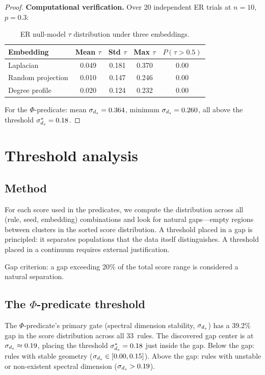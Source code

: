 \documentclass{../shared/primo}
\begin{document}
\begin{proof}
\textbf{Computational verification.} Over 20 independent ER trials at $n = 10$, $p = 0.3$:

\begin{table}[ht]
\centering
\begin{tabular}{lcccc}
\toprule
Embedding & Mean $\tau$ & Std $\tau$ & Max $\tau$ & $P(\tau > 0.5)$ \\
\midrule
Laplacian & 0.049 & 0.181 & 0.370 & 0.00 \\
Random projection & 0.010 & 0.147 & 0.246 & 0.00 \\
Degree profile & 0.020 & 0.124 & 0.232 & 0.00 \\
\bottomrule
\end{tabular}
\caption{ER null-model $\tau$ distribution under three embeddings.}
\label{tab:ernull}
\end{table}

For the $\Phi$-predicate: mean $\sigma_{d_s} = 0.364$, minimum $\sigma_{d_s} = 0.260$, all above the threshold $\sigma^*_{d_s} = 0.18$.
\end{proof}


\section{Threshold analysis}
\label{sec:thresholds}

\subsection{Method}

For each score used in the predicates, we compute the distribution across all (rule, seed, embedding) combinations and look for natural gaps---empty regions between clusters in the sorted score distribution. A threshold placed in a gap is principled: it separates populations that the data itself distinguishes. A threshold placed in a continuum requires external justification.

Gap criterion: a gap exceeding 20\% of the total score range is considered a natural separation.

\subsection{The $\Phi$-predicate threshold}

The $\Phi$-predicate's primary gate (spectral dimension stability, $\sigma_{d_s}$) has a 39.2\% gap in the score distribution across all 33~rules. The discovered gap center is at $\sigma_{d_s} \approx 0.19$, placing the threshold $\sigma^*_{d_s} = 0.18$ just inside the gap. Below the gap: rules with stable geometry ($\sigma_{d_s} \in [0.00, 0.15]$). Above the gap: rules with unstable or non-existent spectral dimension ($\sigma_{d_s} > 0.19$).
\end{document}
